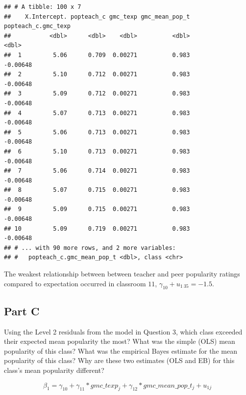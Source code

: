 \documentclass[]{article}
\begin{document}
\begin{verbatim}
## # A tibble: 100 x 7
##    X.Intercept. popteach_c gmc_texp gmc_mean_pop_t popteach_c.gmc_texp
##           <dbl>      <dbl>    <dbl>          <dbl>               <dbl>
##  1         5.06      0.709  0.00271          0.983            -0.00648
##  2         5.10      0.712  0.00271          0.983            -0.00648
##  3         5.09      0.712  0.00271          0.983            -0.00648
##  4         5.07      0.713  0.00271          0.983            -0.00648
##  5         5.06      0.713  0.00271          0.983            -0.00648
##  6         5.10      0.713  0.00271          0.983            -0.00648
##  7         5.06      0.714  0.00271          0.983            -0.00648
##  8         5.07      0.715  0.00271          0.983            -0.00648
##  9         5.09      0.715  0.00271          0.983            -0.00648
## 10         5.09      0.719  0.00271          0.983            -0.00648
## # ... with 90 more rows, and 2 more variables:
## #   popteach_c.gmc_mean_pop_t <dbl>, class <chr>
\end{verbatim}

The weakest relationship between between teacher and peer popularity
ratings compared to expectation occurred in classroom \(11\),
\(\gamma_{10} + u_{1~35} = -1.5\).

\subsection{Part C}\label{part-c-3}

Using the Level 2 residuals from the model in Question 3, which class
exceeded their expected mean popularity the most? What was the simple
(OLS) mean popularity of this class? What was the empirical Bayes
estimate for the mean popularity of this class? Why are these two
estimates (OLS and EB) for this class's mean popularity different?

\[\beta_1 = \gamma_{10} + \gamma_{11}*gmc\_texp_j + \gamma_{12}*gmc\_mean\_pop\_t_j + u_{1j}\]
\end{document}
